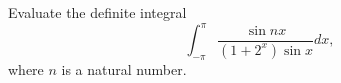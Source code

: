 Evaluate the definite integral
\[\int_{-\pi}^{\pi}\frac{\sin nx}{(1+2^{x})\sin x} dx,\]where \(n\) is a natural number.